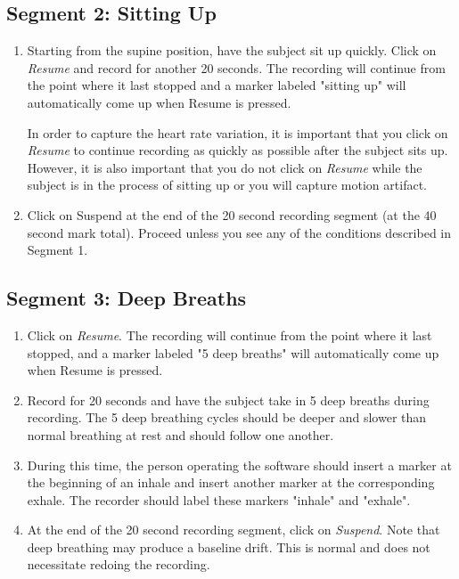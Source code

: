 \documentclass{article}
\begin{document}
\subsection*{Segment 2: Sitting Up}
\begin{enumerate}
	\item Starting from the supine position, have the subject sit up quickly. Click on \textit{Resume} and record for another 20 seconds. The recording will continue from the point where it last stopped and a marker labeled "sitting up" will automatically come up when Resume is pressed.\begin{info}
In order to capture the heart rate variation, it is important that you click on \textit{Resume} to continue recording as quickly as possible after the subject sits up. However, it is also important that you do not click on \textit{Resume} while the subject is in the process of sitting up or you will capture motion artifact.	
\end{info}
	\item Click on Suspend at the end of the 20 second recording segment (at the 40 second mark total). Proceed unless you see any of the conditions described in Segment 1.
\end{enumerate}

\subsection*{Segment 3: Deep Breaths}
\begin{enumerate}
	\item Click on \textit{Resume}. The recording will continue from the point where it last stopped, and a marker labeled "5 deep breaths" will automatically come up when Resume is pressed.
	\item Record for 20 seconds and have the subject take in 5 deep breaths during recording. The 5 deep breathing cycles should be deeper and slower than normal breathing at rest and should follow one another.
	\item During this time, the person operating the software should insert a marker at the beginning of an inhale and insert another marker at the corresponding exhale. The recorder should label these markers "inhale" and "exhale".
	\item At the end of the 20 second recording segment, click on \textit{Suspend}. Note that deep breathing may produce a baseline drift. This is normal and does not necessitate redoing the recording.
\end{enumerate}
\end{document}
